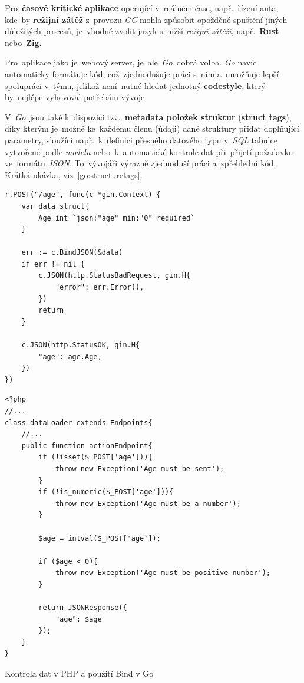 \documentclass[11pt,a4paper]{report}
\let\oldacrshort\acrshort
\renewcommand{\acrshort}[1]{\emph{\normalsize\color[rgb]{0,0,0}\noindent\oldacrshort{#1}}}
\begin{document}
            Pro~\textbf{časově kritické aplikace} operující v~reálném čase, např.~řízení auta, kde~by \textbf{režijní zátěž} z~provozu \acrshort{GC} mohla způsobit opožděné spuštění jiných důležitých procesů, je~vhodné zvolit jazyk s~nižší \emph{režijní zátěží}, např.~\textbf{Rust} nebo~\textbf{Zig}.

            Pro~aplikace jako je~webový server, je~ale~\emph{Go}~dobrá volba. \emph{Go} navíc automaticky formátuje kód, což~zjednodušuje práci s~ním a~umožňuje lepší spolupráci v~týmu, jelikož není~nutné hledat jednotný \textbf{codestyle}, který by~nejlépe vyhovoval potřebám vývoje.

            V~\emph{Go}~jsou také k~dispozici tzv.~\textbf{metadata položek struktur} (\textbf{struct tags}), díky kterým je~možné ke~každému členu (údaji) dané struktury přidat doplňující parametry, sloužící např.~k~definici přesného datového typu v~\acrshort{SQL} tabulce vytvořené podle \emph{modelu} nebo~k~automatické kontrole dat při~přijetí požadavku ve~formátu \acrshort{JSON}. To~vývojáři výrazně zjednoduší práci a~zpřehlední kód. Krátká ukázka, viz~\ref{go:structuretags}.

            \begin{code}
                \begin{minipage}[t]{0.48\linewidth}
                    \begin{verbatim}
r.POST("/age", func(c *gin.Context) {
    var data struct{
        Age int `json:"age" min:"0" required`
    }

    err := c.BindJSON(&data)
    if err != nil {
        c.JSON(http.StatusBadRequest, gin.H{
            "error": err.Error(),
        })
        return
    }

    c.JSON(http.StatusOK, gin.H{
        "age": age.Age,
    })
})
                    \end{verbatim}
                \end{minipage}
                \hfill
                \begin{minipage}[t]{0.48\linewidth}
                    \begin{verbatim}
<?php
//...
class dataLoader extends Endpoints{
    //...
    public function actionEndpoint{
        if (!isset($_POST['age'])){
            throw new Exception('Age must be sent');
        }
        if (!is_numeric($_POST['age'])){
            throw new Exception('Age must be a number');
        }

        $age = intval($_POST['age']);

        if ($age < 0){
            throw new Exception('Age must be positive number');
        }

        return JSONResponse({
            "age": $age
        });
    }
}
                    \end{verbatim}
                \end{minipage}
                \caption{Kontrola dat v PHP a použití Bind v Go}
                \label{go:structuretags}
            \end{code}
\end{document}
